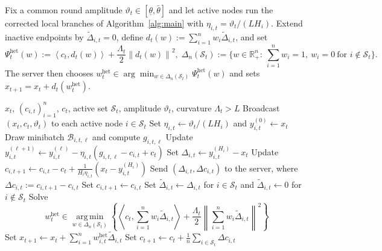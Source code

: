 \documentclass{article}
\theoremstyle{definition}
\newcommand{\RR}{\mathbb R}
\newcommand{\argmin}{\operatorname*{arg\,min}}
\newcommand{\norm}[1]{\left\lVert #1\right\rVert}
\newcommand{\ip}[2]{\left\langle #1,#2\right\rangle}
\begin{document}
Fix a common round amplitude $\vartheta_t\in[\underline\theta,\bar\theta]$ and let active nodes run the corrected local branches of Algorithm~\ref{alg:main} with $\eta_{i,t}=\vartheta_t/(L H_i)$. Extend inactive endpoints by $\widetilde\Delta_{i,t}=0$, define $d_t(w):=\sum_{i=1}^n w_i\widetilde\Delta_{i,t}$, and set
\begin{equation*}
\Psi_t^{\mathrm{het}}(w):=\ip{c_t}{d_t(w)}+\frac{\Lambda_t}{2}\norm{d_t(w)}^2,\; \Delta_n(\mathcal S_t):=\{w\in\RR_+^n:\ \sum_{i=1}^n w_i=1,\ w_i=0\ \text{for }i\notin\mathcal S_t\}.
\end{equation*}
The server then chooses $w_t^{\mathrm{het}}\in\arg\min_{w\in\Delta_n(\mathcal S_t)}\Psi_t^{\mathrm{het}}(w)$ and sets $x_{t+1}=x_t+d_t(w_t^{\mathrm{het}})$.
\begin{algorithm}[ht]
\caption{Heterogeneous Post-local HEW-Local SGD}
\label{alg:realized-het}
\begin{algorithmic}[1]
\Require $x_t$, $(c_{i,t})_{i=1}^n$, $c_t$, active set $\mathcal S_t$, amplitude $\vartheta_t$, curvature $\Lambda_t>L$
\State Broadcast $(x_t,c_t,\vartheta_t)$ to each active node $i\in\mathcal S_t$
    \State Set $\eta_{i,t}\gets \vartheta_t/(L H_i)$ and $y_{i,t}^{(0)}\gets x_t$
        \State Draw minibatch $\mathcal B_{i,t,\ell}$ and compute $g_{i,t,\ell}$
        \State Update $y_{i,t}^{(\ell+1)}
        \gets
        y_{i,t}^{(\ell)}-\eta_{i,t}(g_{i,t,\ell}-c_{i,t}+c_t)$
    \EndFor
    \State Set $\Delta_{i,t}\gets y_{i,t}^{(H_i)}-x_t$
    \State Update $c_{i,t+1}
    \gets
    c_{i,t}-c_t+\frac{1}{H_i\eta_{i,t}}(x_t-y_{i,t}^{(H_i)})$
    \State Send $(\Delta_{i,t},\Delta c_{i,t})$ to the server, where $\Delta c_{i,t}:=c_{i,t+1}-c_{i,t}$
\EndFor
{}
    \State Set $c_{i,t+1}\gets c_{i,t}$
\EndFor
\State Set $\widetilde\Delta_{i,t}\gets \Delta_{i,t}$ for $i\in\mathcal S_t$ and $\widetilde\Delta_{i,t}\gets 0$ for $i\notin\mathcal S_t$
\State Solve
\[
w_t^{\mathrm{het}}
\in
\argmin_{w\in\Delta_n(\mathcal S_t)}
\left\{
\ip{c_t}{\sum_{i=1}^n w_i\widetilde\Delta_{i,t}}
+\frac{\Lambda_t}{2}\norm{\sum_{i=1}^n w_i\widetilde\Delta_{i,t}}^2
\right\}
\]
\State Set $x_{t+1}\gets x_t+\sum_{i=1}^n w_{i,t}^{\mathrm{het}}\widetilde\Delta_{i,t}$
\State Set $c_{t+1}\gets c_t+\frac1n\sum_{i\in\mathcal S_t}\Delta c_{i,t}$
\end{algorithmic}
\end{algorithm}
\end{document}
